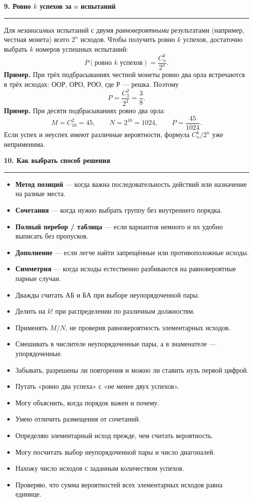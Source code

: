 \documentclass[a4paper,11pt]{article}
\newcommand{\topic}[1]{%
 \Needspace{5\baselineskip}\par\vspace{0.75em}%
 {\large\bfseries\color{darkaccent}#1}\par\vspace{0.35em}%
 {\color{accent}\rule{\linewidth}{0.55pt}}\par\vspace{0.4em}%
}
\newcommand{\subtopic}[1]{\Needspace{3\baselineskip}\par\medskip{\bfseries\color{darkaccent}#1}\par\smallskip}
\newcommand{\ex}[1]{\textcolor{darkaccent}{\bfseries Пример.} #1}
\newcommand{\smallnote}[1]{{\small #1}}
\begin{document}
\topic{9. Ровно \(k\) успехов за \(n\) испытаний}
Для \emph{независимых} испытаний с двумя \emph{равновероятными} результатами (например, честная монета) всего \(2^n\) исходов. Чтобы получить ровно \(k\) успехов, достаточно выбрать \(k\) номеров успешных испытаний:
\[
\boxed{P(\text{ровно }k\text{ успехов})=\frac{C_n^k}{2^n}}.
\]
\ex{При трёх подбрасываниях честной монеты ровно два орла встречаются в трёх исходах: ООР, ОРО, РОО, где Р --- решка. Поэтому}
\[
P=\frac{C_3^2}{2^3}=\boxed{\frac38}.
\]
\ex{При десяти подбрасываниях ровно два орла:}
\[
 M=C_{10}^2=45,\qquad N=2^{10}=1024,\qquad P=\boxed{\frac{45}{1024}}.
\]
\smallnote{Если успех и неуспех имеют различные вероятности, формула \(C_n^k/2^n\) уже неприменима.}

\topic{10. Как выбрать способ решения}
\begin{itemize}
 \item \textbf{Метод позиций} --- когда важна последовательность действий или назначение на разные места.
 \item \textbf{Сочетания} --- когда нужно выбрать группу без внутреннего порядка.
 \item \textbf{Полный перебор / таблица} --- если вариантов немного и их удобно выписать без пропусков.
 \item \textbf{Дополнение} --- если легче найти запрещённые или противоположные исходы.
 \item \textbf{Симметрия} --- когда исходы естественно разбиваются на равновероятные парные случаи.
\end{itemize}

\subtopic{Типичные ошибки}
\begin{itemize}
 \item Дважды считать АБ и БА при выборе неупорядоченной пары.
 \item Делить на \(k!\) при распределении по различным должностям.
 \item Применять \(M/N\), не проверив равновероятность элементарных исходов.
 \item Смешивать в числителе неупорядоченные пары, а в знаменателе --- упорядоченные.
 \item Забывать, разрешены ли повторения и можно ли ставить нуль первой цифрой.
 \item Путать «ровно два успеха» с «не менее двух успехов».
\end{itemize}

\subtopic{Проверьте себя}
\begin{itemize}[label=$\square$,itemsep=2pt]
 \item Могу объяснить, когда порядок важен и почему.
 \item Умею отличить размещения от сочетаний.
 \item Определяю элементарный исход прежде, чем считать вероятность.
 \item Могу посчитать выбор неупорядоченной пары и число диагоналей.
 \item Нахожу число исходов с заданным количеством успехов.
 \item Проверяю, что сумма вероятностей всех элементарных исходов равна единице.
\end{itemize}
\end{document}
